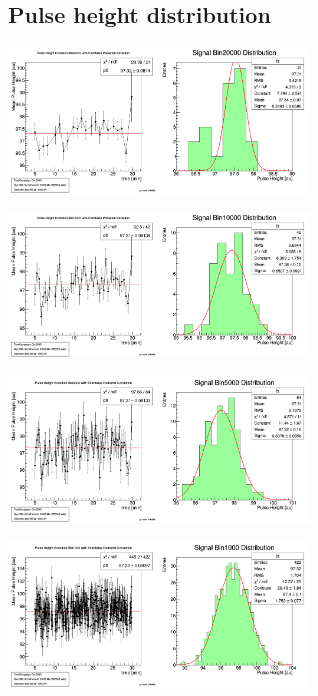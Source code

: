 \documentclass[9pt]{beamer}
\begin{document}
\subsection{Pulse height distribution}
\begin{frame}
	\begin{center}
		\includegraphics[width=8cm]{PHEvolutionOverview20000}
	\end{center}
	\begin{center}
		\includegraphics[width=8cm]{PHEvolutionOverview10000}
	\end{center}
\end{frame}
\begin{frame}
	\begin{center}
		\includegraphics[width=8cm]{PHEvolutionOverview5000}
	\end{center}
	\begin{center}
		\includegraphics[width=8cm]{PHEvolutionOverview1000}
	\end{center}
\end{frame}
\end{document}
